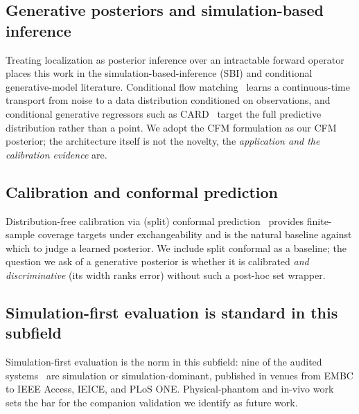 \subsection{Generative posteriors and simulation-based inference}
Treating localization as posterior inference over an intractable forward operator
places this work in the simulation-based-inference (SBI) and conditional
generative-model literature. Conditional flow matching~\cite{lipman2023,tong2024}
learns a continuous-time transport from noise to a data distribution conditioned
on observations, and conditional generative regressors such as
CARD~\cite{han2022card} target the full predictive distribution rather than a
point. We adopt the CFM formulation as our CFM posterior; the architecture itself
is not the novelty, the \emph{application and the calibration evidence} are.

\subsection{Calibration and conformal prediction}
Distribution-free calibration via (split) conformal prediction~\cite{vovk2005,romano2019cqr}
provides finite-sample coverage targets under exchangeability and is the natural
baseline against which to judge a learned posterior. We include split conformal
as a baseline; the question we ask of a generative posterior is whether it is
calibrated \emph{and discriminative} (its width ranks error) without such a
post-hoc set wrapper.

\subsection{Simulation-first evaluation is standard in this subfield}
Simulation-first evaluation is the norm in this subfield: nine of the audited
systems~\cite{anzai2012,ito2014,ito2016,dmitrieva2021,pourhomayoun2014,hiyoshi2019,nadimi2014,ye2014,krishnan2025}
are simulation or simulation-dominant, published in venues from EMBC to IEEE
Access, IEICE, and PLoS ONE. Physical-phantom and in-vivo
work~\cite{barbi2019,yoshitake2022,oleksy2022,xiao2022,hasnain2024,hasnain2026}
sets the bar for the companion validation we identify as future work.
